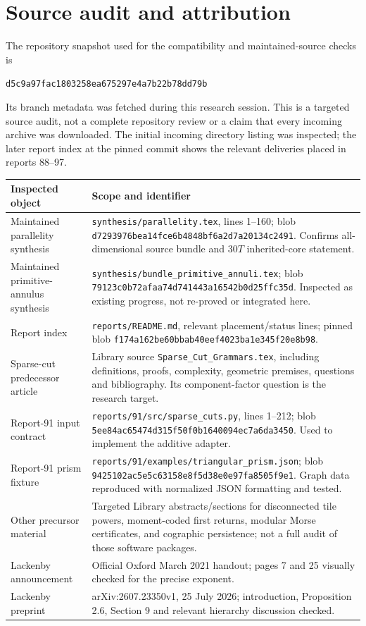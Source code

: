 \documentclass[11pt,letterpaper]{article}
\theoremstyle{definition}
\theoremstyle{remark}\newtheorem{remark}[theorem]{Remark}
\DeclareRobustCommand{\code}[1]{\nolinkurl{#1}}
\newcommand{\pin}{\code{d5c9a97fac1803258ea675297e4a7b22b78dd79b}}
\begin{document}
\appendix
\section{Source audit and attribution}
\label{app:audit}
The repository snapshot used for the compatibility and maintained-source checks is
\begin{center}\small\pin\end{center}
Its branch metadata was fetched during this research session. This is a targeted source audit, not a complete repository review or a claim that every incoming archive was downloaded. The initial incoming directory listing was inspected; the later report index at the pinned commit shows the relevant deliveries placed in reports 88--97.

\begin{longtable}{@{}>{\raggedright\arraybackslash}p{}>{\raggedright\arraybackslash}p{}@{}}
\toprule
Inspected object & Scope and identifier\\\midrule\endhead
Maintained parallelity synthesis & \code{synthesis/parallelity.tex}, lines 1--160; blob \code{d7293976bea14fce6b4848bf6a2d7a20134c2491}. Confirms all-dimensional source bundle and $30T$ inherited-core statement.\\
Maintained primitive-annulus synthesis & \code{synthesis/bundle_primitive_annuli.tex}; blob \code{79123c0b72afaa74d741443a16542b0d25ffc35d}. Inspected as existing progress, not re-proved or integrated here.\\
Report index & \code{reports/README.md}, relevant placement/status lines; pinned blob \code{f174a162be60bbab40eef4023ba1e345f20e8b98}.\\
Sparse-cut predecessor article & Library source \code{Sparse_Cut_Grammars.tex}, including definitions, proofs, complexity, geometric premises, questions and bibliography. Its component-factor question is the research target.\\
Report-91 input contract & \code{reports/91/src/sparse_cuts.py}, lines 1--212; blob \code{5ee84ac65474d315f50f0b1640094ec7a6da3450}. Used to implement the additive adapter.\\
Report-91 prism fixture & \code{reports/91/examples/triangular_prism.json}; blob \code{9425102ac5e5c63158e8f5d38e0e97fa8505f9e1}. Graph data reproduced with normalized JSON formatting and tested.\\
Other precursor material & Targeted Library abstracts/sections for disconnected tile powers, moment-coded first returns, modular Morse certificates, and cographic persistence; not a full audit of those software packages.\\
Lackenby announcement & Official Oxford March 2021 handout; pages 7 and 25 visually checked for the precise exponent.\\
Lackenby preprint & arXiv:2607.23350v1, 25 July 2026; introduction, Proposition 2.6, Section 9 and relevant hierarchy discussion checked.\\
\bottomrule
\end{longtable}
\end{document}

